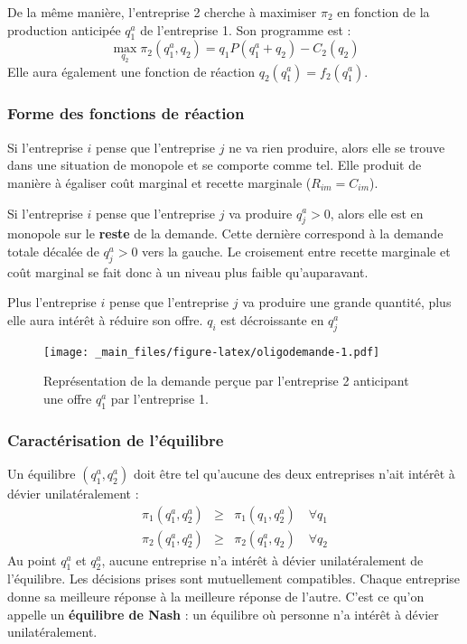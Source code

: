 \documentclass[
]{book}
\theoremstyle{definition}
\theoremstyle{definition}
\theoremstyle{definition}
\theoremstyle{definition}
\theoremstyle{remark}
\begin{document}
De la même manière, l'entreprise 2 cherche à maximiser \(\pi_2\) en fonction de la production anticipée \(q_1^a\) de l'entreprise 1.
Son programme est :
\[
\max_{q_2} \pi_2(q_1^a, q_2) =  q_1P(q_1^a+q_2)-C_2(q_2)
\]
Elle aura également une fonction de réaction \(q_2(q_1^a)=f_2(q_1^a)\).

\hypertarget{forme-des-fonctions-de-ruxe9action}{%
\subsubsection{Forme des fonctions de réaction}\label{forme-des-fonctions-de-ruxe9action}}

Si l'entreprise \(i\) pense que l'entreprise \(j\) ne va rien produire, alors elle se trouve dans une situation de monopole et se comporte comme tel.
Elle produit de manière à égaliser coût marginal et recette marginale (\(R_{im}=C_{im}\)).

Si l'entreprise \(i\) pense que l'entreprise \(j\) va produire \(q_j^a>0\), alors elle est en monopole sur le \textbf{reste} de la demande.
Cette dernière correspond à la demande totale décalée de \(q_j^a>0\) vers la gauche.
Le croisement entre recette marginale et coût marginal se fait donc à un niveau plus faible qu'auparavant.

Plus l'entreprise \(i\) pense que l'entreprise \(j\) va produire une grande quantité, plus elle aura intérêt à réduire son offre.
\(q_i\) est décroissante en \(q_j^a\)

\begin{figure}
\centering
\texttt{[image: \_main\_files/figure-latex/oligodemande-1.pdf]}
\caption{\label{fig:oligodemande}Représentation de la demande perçue par l'entreprise 2 anticipant une offre \(q_1^a\) par l'entreprise 1.}
\end{figure}

\hypertarget{caractuxe9risation-de-luxe9quilibre}{%
\subsubsection{Caractérisation de l'équilibre}\label{caractuxe9risation-de-luxe9quilibre}}

Un équilibre \((q_1^a, q_2^a)\) doit être tel qu'aucune des deux entreprises n'ait intérêt à dévier unilatéralement :
\[
\begin{array}{rcl}
\pi_1(q_1^a, q_2^a) &\geq& \pi_1(q_1, q_2^a)\quad \forall q_1\\
\pi_2(q_1^a, q_2^a) &\geq& \pi_2(q_1^a, q_2)\quad \forall q_2
\end{array}
\]
Au point \(q_1^a\) et \(q_2^a\), aucune entreprise n'a intérêt à dévier unilatéralement de l'équilibre.
Les décisions prises sont mutuellement compatibles.
Chaque entreprise donne sa meilleure réponse à la meilleure réponse de l'autre.
C'est ce qu'on appelle un \textbf{équilibre de Nash} : un équilibre où personne n'a intérêt à dévier unilatéralement.
\end{document}
